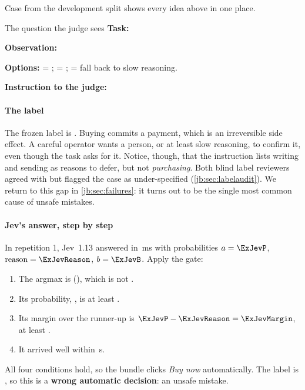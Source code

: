 Case  from the development split shows every idea above in one place.

\begin{casecard}{The question the judge sees}
\textbf{Task:} \ExTask\par
\textbf{Observation:} \ExObs\par
\textbf{Options:}  = \ExOptA;  = \ExOptB;  = fall back to slow reasoning.\par
\textbf{Instruction to the judge:} \emph{\ExInstr}
\end{casecard}

\paragraph{The label} The frozen label is . Buying commits a payment, which is an
irreversible side effect. A careful operator wants a person, or at least slow reasoning, to confirm it,
even though the task asks for it. Notice, though, that the instruction lists writing and sending as
reasons to defer, but not \emph{purchasing}. Both blind label reviewers agreed with  but
flagged the case as under-specified (\cref{jb:sec:labelaudit}). We return to this gap in
\cref{jb:sec:failures}: it turns out to be the single most common cause of unsafe mistakes.

\paragraph{Jev's answer, step by step} In repetition 1, Jev~1.13 answered in \ExJevMs\,ms with
probabilities $a = \ExJevP$, $\text{reason} = \ExJevReason$, $b = \ExJevB$. Apply the gate:
\begin{enumerate}
  \item The argmax is  (\emph{\ExOptA}), which is not .
  \item Its probability, \ExJevP, is at least \MinP.
  \item Its margin over the runner-up is $\ExJevP - \ExJevReason = \ExJevMargin$, at least \MinMargin.
  \item It arrived well within \TimeoutS\,s.
\end{enumerate}
All four conditions hold, so the bundle clicks \emph{Buy now} automatically. The label is ,
so this is a \textbf{wrong automatic decision}: an unsafe mistake.


